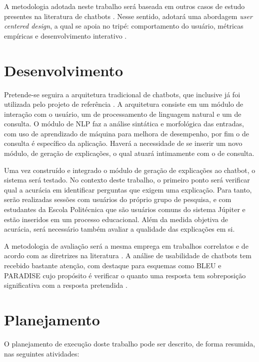 \documentclass[]{politex}
\begin{document}
A metodologia adotada neste trabalho será baseada em outros casos de estudo presentes na literatura de chatbots \cite{Musto-et-al} \cite{Correa-et-al-2018}. Nesse sentido, adotará uma abordagem \textit{user centered design}, a qual se apoia no tripé: comportamento do usuário, métricas empíricas e desenvolvimento interativo \cite{Gould:1983:DUP:800045.801579}.

\section{Desenvolvimento}

Pretende-se seguira a arquitetura tradicional de chatbots, que inclusive já foi utilizada pelo projeto de referência \cite{Correa-et-al-2018}. A arquitetura consiste em um módulo de interação com o usuário, um de processamento de linguagem natural e um de consulta. O módulo de NLP faz a análise sintática e morfológica das entradas, com uso de aprendizado de máquina para melhora de desempenho, por fim o de consulta é específico da aplicação. Haverá a necessidade de se inserir um novo módulo, de geração de explicações, o qual atuará intimamente com o de consulta.

Uma vez construído e integrado o módulo de geração de explicações ao chatbot, o sistema será testado. No contexto deste trabalho, o primeiro ponto será verificar qual a acurácia em identificar perguntas que exigem uma explicação. Para tanto, serão realizadas sessões com usuários do próprio grupo de pesquisa, e com estudantes da Escola Politécnica que são usuários comuns do sistema Júpiter e estão inseridos em um processo educacional. Além da medida objetiva de acurácia, será necessário também avaliar a qualidade das explicações em si. 

A metodologia de avaliação será a mesma emprega em trabalhos correlatos e de acordo com as diretrizes na literatura \cite{Correa-et-al-2018}. A análise de usabilidade de chatbots tem recebido bastante atenção, com destaque para esquemas como BLEU e PARADISE cujo propósito é verificar o quanto uma resposta tem sobreposição significativa com a resposta pretendida \cite{Walker:1997:PFE:979617.979652}.

\section{Planejamento}

O planejamento de execução doste trabalho pode ser descrito, de forma resumida, nas seguintes atividades:
\end{document}
